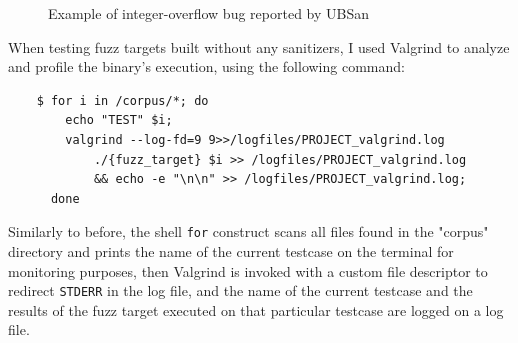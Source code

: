 \begin{figure}[h]
\caption{Example of integer-overflow bug reported by UBSan}
\label{fig:ubsan_example}
\end{figure}





\newpage
When testing fuzz targets built without any sanitizers, I used Valgrind to analyze and profile the binary's execution, using the following command:
\begin{verbatim}
    $ for i in /corpus/*; do 
        echo "TEST" $i; 
        valgrind --log-fd=9 9>>/logfiles/PROJECT_valgrind.log 
            ./{fuzz_target} $i >> /logfiles/PROJECT_valgrind.log 
            && echo -e "\n\n" >> /logfiles/PROJECT_valgrind.log; 
      done
\end{verbatim}

Similarly to before, the shell \verb|for| construct scans all files found in the "corpus" directory and prints the name of the current testcase on the terminal for monitoring purposes, then Valgrind is invoked with a custom file descriptor to redirect \verb|STDERR| in the log file, and the name of the current testcase and the results of the fuzz target executed on that particular testcase are logged on a log file.

